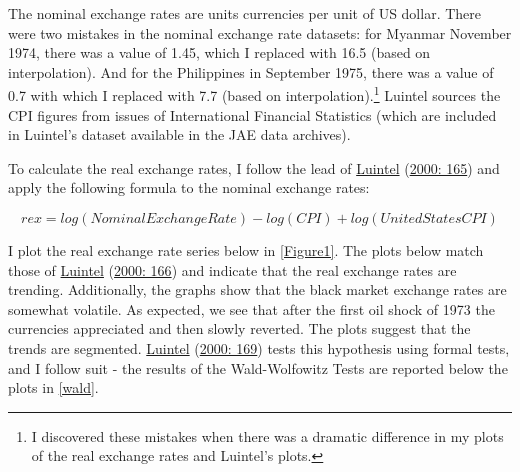 \documentclass[11pt,preprint, authoryear]{elsarticle}
\numberwithin{equation}{section}
\numberwithin{figure}{section}
\numberwithin{table}{section}
\let\rmarkdownfootnote\footnote%
\def\footnote{\protect\rmarkdownfootnote}
\begin{document}
The nominal exchange rates are units currencies per unit of US dollar.
There were two mistakes in the nominal exchange rate datasets: for
Myanmar November 1974, there was a value of 1.45, which I replaced with
16.5 (based on interpolation). And for the Philippines in September
1975, there was a value of 0.7 with which I replaced with 7.7 (based on
interpolation).\footnote{I discovered these mistakes when there was a
  dramatic difference in my plots of the real exchange rates and
  Luintel's plots.} Luintel sources the CPI figures from issues of
International Financial Statistics (which are included in Luintel's
dataset available in the JAE data archives).

To calculate the real exchange rates, I follow the lead of
\protect\hyperlink{ref-Kul}{Luintel} (\protect\hyperlink{ref-Kul}{2000:
165}) and apply the following formula to the nominal exchange rates:

\[
rex = log(Nominal Exchange Rate) - log(CPI) + log(United States CPI)
\]

I plot the real exchange rate series below in \ref{Figure1}. The plots
below match those of \protect\hyperlink{ref-Kul}{Luintel}
(\protect\hyperlink{ref-Kul}{2000: 166}) and indicate that the real
exchange rates are trending. Additionally, the graphs show that the
black market exchange rates are somewhat volatile. As expected, we see
that after the first oil shock of 1973 the currencies appreciated and
then slowly reverted. The plots suggest that the trends are segmented.
\protect\hyperlink{ref-Kul}{Luintel} (\protect\hyperlink{ref-Kul}{2000:
169}) tests this hypothesis using formal tests, and I follow suit - the
results of the Wald-Wolfowitz Tests are reported below the plots in
\ref{wald}.
\end{document}
